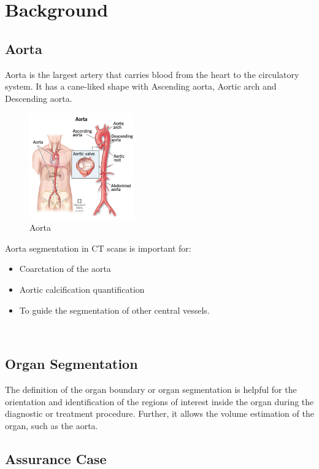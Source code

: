 \section{Background} \label{bg}

\subsection{Aorta}
Aorta is the largest artery that carries blood from the heart to the circulatory system. It has a cane-liked shape with Ascending aorta, Aortic arch and Descending aorta. 

\begin{figure}[ht]
    \centering
    \includegraphics[width=0.4\textwidth]{figures/Intro/Aorta.png}
    \caption[Aorta]{Aorta}
    \label{fig_aorta}
\end{figure}

Aorta segmentation in CT scans is important for:
\begin{itemize}
\item Coarctation of the aorta
\item Aortic calcification quantification
\item To guide the segmentation of other central vessels. 
\end{itemize} ~\\

\subsection{Organ Segmentation}
The definition of the organ boundary or organ segmentation is helpful for the orientation and identification of the regions of interest inside the organ during the diagnostic or treatment procedure. Further, it allows the volume estimation of the organ, such as the aorta.

\subsection{Assurance Case}

